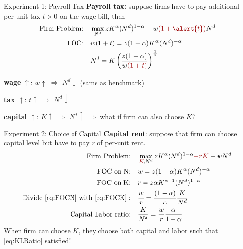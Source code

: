 \documentclass[11pt,aspectratio=169,usenames,dvipsnames]{beamer}
\newcommand{\red}[1]{\textcolor{red}{#1}}
\let\tempone\itemize
\let\temptwo\enditemize
\renewenvironment{itemize}{\tempone\addtolength{\itemsep}{\fill}}{\temptwo}
\begin{document}
\begin{frame}{Experiment 1: Payroll Tax}
\label{slide:Experiment_1__Payroll_Tax}
    \textbf{Payroll tax:} suppose firms have to pay additional per-unit tax $ t > 0$ on the wage bill, then
    \begin{align}
        \text{Firm Problem:} \quad
            & \max_{N^{d}} z K^{\alpha} ( N^{d} )^{1-\alpha} - w \red{( 1+\alert{t} )} N^{d}
        \\
        \text{FOC:} \quad
            & w( 1+t ) = z ( 1-\alpha ) K^{\alpha} ( N^{d} )^{-\alpha}
        \\
            & N^{d} = K \left(
                \frac{z ( 1-\alpha )}{w \red{( 1+t )}}
            \right)^{\frac{1}{\alpha}}
    \end{align}
    \begin{itemize}
        \item \textbf{wage $ \uparrow  $}: $ w \uparrow  $ $ \Rightarrow  $ $ N^{d} \downarrow  $ (same as benchmark)
        \item \textbf{tax $ \uparrow  $}: $ t \uparrow  $ $ \Rightarrow  $ $ N^{d} \downarrow  $
        \item \textbf{capital $ \uparrow  $}: $ K \uparrow  $ $ \Rightarrow  $ $ N^{d} \uparrow  $ $ \Rightarrow  $ \alert{what if firm can also choose $ K $?}
    \end{itemize}
\end{frame}

\begin{frame}{Experiment 2: Choice of Capital}
\label{slide:Experiment_2__Choice_of_Capital}
    \textbf{Capital rent}: suppose that firm can choose capital level but have to pay $ r $ of per-unit rent.
    \begin{align}
        \text{Firm Problem:} \quad
            & \max_{\red{K}, N^{d}} z K^{\alpha} ( N^{d} )^{1-\alpha} \red{- r K} - w N^{d}
        \\
        \text{FOC on N:} \quad
            & w = z ( 1-\alpha ) K^{\alpha} ( N^{d} )^{-\alpha}
            \label{eq:FOCN}
        \\
        \text{FOC on K:} \quad
            & r = z \alpha K^{\alpha-1} ( N^{d} )^{1-\alpha}
            \label{eq:FOCK}
        \\
        \text{Divide } \eqref{eq:FOCN} \text{ with } \eqref{eq:FOCK}: \quad
            & \frac{w}{r} = \frac{( 1-\alpha )}{\alpha} \frac{K}{N^{d}}
        \\
        \text{Capital-Labor ratio:} \quad
            & \frac{K}{N^{d}} = \frac{w}{r} \frac{\alpha}{1-\alpha}
            \label{eq:KLRatio}
    \end{align}
    When firm can choose $ K $, they choose both capital and labor such that \eqref{eq:KLRatio} satisfied!
\end{frame}
\end{document}
